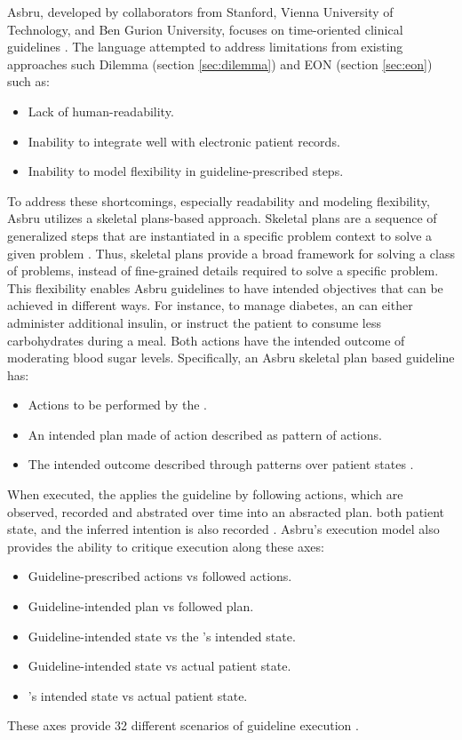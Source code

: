 Asbru, developed by collaborators from Stanford, Vienna
University of Technology, and Ben Gurion University, focuses on
time-oriented clinical guidelines \cite{ClerqAIM03}.
The language attempted to address limitations from existing approaches
such Dilemma (section \ref{sec:dilemma}) and EON (section \ref{sec:eon})
such as:
\begin{itemize}
  \item Lack of human-readability.
  \item Inability to integrate well with electronic patient records.
  \item Inability to model flexibility in guideline-prescribed steps.
\end{itemize}

To address these shortcomings, especially readability and modeling
flexibility, Asbru utilizes a skeletal plans-based approach.
Skeletal plans are a sequence of generalized steps that are instantiated
in a specific problem context to solve a given problem \cite{FriedlandJAR85}.
Thus, skeletal plans provide a broad framework for solving a class of problems,
instead of fine-grained details required to solve a specific problem.
This flexibility enables Asbru guidelines to have intended objectives that
can be achieved in different ways. For instance, to manage diabetes,
an \HCP{} can either administer additional insulin, or instruct
the patient to consume less carbohydrates during a meal. Both actions
have the intended outcome of moderating blood sugar levels.
Specifically, an Asbru skeletal plan based guideline has:
\begin{itemize}
  \item Actions to be performed by the \HCP{}.
  \item An intended plan made of action described as pattern of actions.
  \item The intended outcome described through patterns over patient states \cite{ShaharAIM98}.
\end{itemize}

When executed, the \HCP{} applies the guideline by following actions,
which are observed, recorded and abstrated over time into an absracted plan.
both patient state, and the inferred intention is also recorded
\cite{ShaharAIM98}. Asbru's execution model also provides the ability
to critique execution along these axes:
\begin{itemize}
  \item Guideline-prescribed actions vs \HCP{} followed actions.
  \item Guideline-intended plan vs \HCP{} followed plan.
  \item Guideline-intended state vs the \HCP{}'s intended state.
  \item Guideline-intended state vs actual patient state.
  \item \HCPs{}'s intended state vs actual patient state.
\end{itemize}
These axes provide 32 different scenarios of guideline execution
\cite{ShaharAIM98}.

